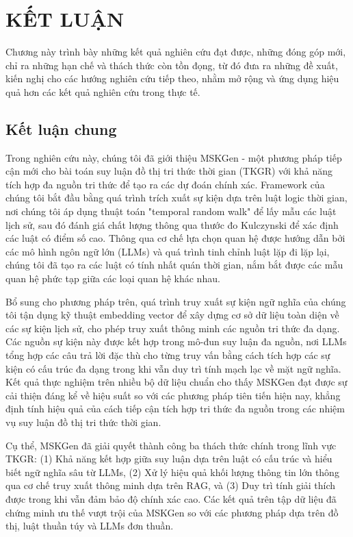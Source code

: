 \chapter{KẾT LUẬN}
\label{Chapter6}

Chương này trình bày những kết quả nghiên cứu đạt được, những đóng góp mới, chỉ ra những hạn chế và thách thức còn tồn đọng, từ đó đưa ra những đề xuất, kiến nghị cho các hướng nghiên cứu tiếp theo, nhằm mở rộng và ứng dụng hiệu quả hơn các kết quả nghiên cứu trong thực tế.

\section{Kết luận chung}
Trong nghiên cứu này, chúng tôi đã giới thiệu MSKGen - một phương pháp tiếp cận mới cho bài toán suy luận đồ thị tri thức thời gian (TKGR) với khả năng tích hợp đa nguồn tri thức để tạo ra các dự đoán chính xác. Framework của chúng tôi bắt đầu bằng quá trình trích xuất sự kiện dựa trên luật logic thời gian, nơi chúng tôi áp dụng thuật toán "temporal random walk" để lấy mẫu các luật lịch sử, sau đó đánh giá chất lượng thông qua thước đo Kulczynski để xác định các luật có điểm số cao. Thông qua cơ chế lựa chọn quan hệ được hướng dẫn bởi các mô hình ngôn ngữ lớn (LLMs) và quá trình tinh chỉnh luật lặp đi lặp lại, chúng tôi đã tạo ra các luật có tính nhất quán thời gian, nắm bắt được các mẫu quan hệ phức tạp giữa các loại quan hệ khác nhau.

Bổ sung cho phương pháp trên, quá trình truy xuất sự kiện ngữ nghĩa của chúng tôi tận dụng kỹ thuật embedding vector để xây dựng cơ sở dữ liệu toàn diện về các sự kiện lịch sử, cho phép truy xuất thông minh các nguồn tri thức đa dạng. Các nguồn sự kiện này được kết hợp trong mô-đun suy luận đa nguồn, nơi LLMs tổng hợp các câu trả lời đặc thù cho từng truy vấn bằng cách tích hợp các sự kiện có cấu trúc đa dạng trong khi vẫn duy trì tính mạch lạc về mặt ngữ nghĩa. Kết quả thực nghiệm trên nhiều bộ dữ liệu chuẩn cho thấy MSKGen đạt được sự cải thiện đáng kể về hiệu suất so với các phương pháp tiên tiến hiện nay, khẳng định tính hiệu quả của cách tiếp cận tích hợp tri thức đa nguồn trong các nhiệm vụ suy luận đồ thị tri thức thời gian.

Cụ thể, MSKGen đã giải quyết thành công ba thách thức chính trong lĩnh vực TKGR: (1) Khả năng kết hợp giữa suy luận dựa trên luật có cấu trúc và hiểu biết ngữ nghĩa sâu từ LLMs, (2) Xử lý hiệu quả khối lượng thông tin lớn thông qua cơ chế truy xuất thông minh dựa trên RAG, và (3) Duy trì tính giải thích được trong khi vẫn đảm bảo độ chính xác cao. Các kết quả trên tập dữ liệu đã chứng minh ưu thế vượt trội của MSKGen so với các phương pháp dựa trên đồ thị, luật thuần túy và LLMs đơn thuần.

